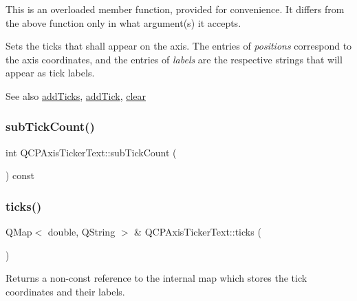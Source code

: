 This is an overloaded member function, provided for convenience. It differs from the above function only in what argument(s) it accepts.

Sets the ticks that shall appear on the axis. The entries of {\itshape positions} correspond to the axis coordinates, and the entries of {\itshape labels} are the respective strings that will appear as tick labels.

\begin{DoxySeeAlso}{See also}
\mbox{\hyperlink{class_q_c_p_axis_ticker_text_aba34051300eecaefbedb2df8feff2d45}{add\+Ticks}}, \mbox{\hyperlink{class_q_c_p_axis_ticker_text_aada3db69e5fc6585aaa4ea5d89552eb0}{add\+Tick}}, \mbox{\hyperlink{class_q_c_p_axis_ticker_text_a21826d2fcd9a25c194d34d4f67aa1460}{clear}} 
\end{DoxySeeAlso}
\mbox{\label{class_q_c_p_axis_ticker_text_a5c3c59e8fdf4c96568dd50d4a653e791}} 
\subsubsection{\texorpdfstring{subTickCount()}{subTickCount()}}
{\footnotesize\ttfamily int Q\+C\+P\+Axis\+Ticker\+Text\+::sub\+Tick\+Count (\begin{DoxyParamCaption}{ }\end{DoxyParamCaption}) const\hspace{0.3cm}{\ttfamily [inline]}}

\mbox{\label{class_q_c_p_axis_ticker_text_ac84622a6bb4f2a98474e185ecaf3189a}} 
\subsubsection{\texorpdfstring{ticks()}{ticks()}}
{\footnotesize\ttfamily Q\+Map$<$ double, Q\+String $>$ \& Q\+C\+P\+Axis\+Ticker\+Text\+::ticks (\begin{DoxyParamCaption}{ }\end{DoxyParamCaption})\hspace{0.3cm}{\ttfamily [inline]}}

Returns a non-\/const reference to the internal map which stores the tick coordinates and their labels.

